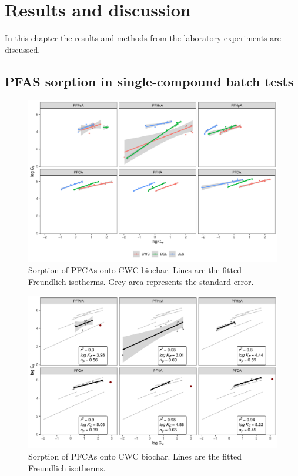 \chapter{Results and discussion}\label{chap:Results&Disc}
In this chapter the results and methods from the laboratory experiments are discussed.

\section{PFAS sorption in single-compound batch tests}

\begin{figure}
    \centering
    \includegraphics[width=\textwidth]{R/figs/Sorption_isotherms_single_BC.pdf}
    \caption{Sorption of PFCAs onto CWC biochar. Lines are the fitted Freundlich isotherms. Grey area represents the standard error.}
    \label{fig:Sorption_isotherms}
\end{figure}

\begin{figure}
    \centering
    \includegraphics[width=\textwidth]{R/figs/CWC_facet_isotherm.pdf}
    \caption{Sorption of PFCAs onto CWC biochar. Lines are the fitted Freundlich isotherms.}
    \label{fig:CWC_isotherm}
\end{figure}

